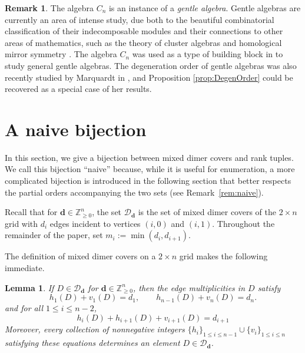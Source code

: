 \documentclass{amsart}
\newtheorem{lemma}[theorem]{Lemma}
\theoremstyle{definition}
\newtheorem{remark}[theorem]{Remark}
\begin{document}
\begin{remark}
The algebra $C_n$ is an instance of a \emph{gentle algebra}. Gentle algebras are currently an area of intense study, due both to the beautiful combinatorial classification of their indecomposable modules \cite{zbMATH03989588,zbMATH03904786} and their connections to other areas of mathematics, such as the theory of cluster algebras \cite{zbMATH05704468} and homological mirror symmetry \cite{zbMATH07159952}. The algebra $C_n$  was used as a type of building block in \cite{Schemes} to study general gentle algebras. The degeneration order of gentle algebras was also recently studied by Marquardt in \cite{marquardt2026}, and Proposition \ref{prop:DegenOrder} could be recovered as a special case of her results. 
\end{remark}




\section{A naive bijection}
\label{sec:naive}

In this section, we give a bijection between mixed dimer covers and rank tuples. We call this bijection ``naive'' because, while it is useful for enumeration, a more complicated bijection is introduced in the following section that better respects the partial orders accompanying the two sets (see Remark~\ref{rem:naive}).

 Recall that for $\mathbf{d} \in \mathbb{Z}_{\geq 0}^n$, the set $\mathcal{D}_{\mathbf{d}}$ is the set of mixed dimer covers of the $2 \times n$ grid with $d_i$ edges incident to vertices $(i,0)$ and $(i,1)$. Throughout the remainder of the paper, set $m_i:= \min(d_i,d_{i+1})$. 


The definition of mixed dimer covers on a $2 \times n$ grid makes the following immediate.

\begin{lemma}\label{lem:VsHsDs}
If $D \in \mathcal{D}_{\mathbf{d}}$ for $\mathbf{d}\in\mathbb{Z}_{\ge 0}^n$, then the edge multiplicities in $D$ satisfy  
\begin{equation*}
 h_1(D) + v_1(D) = d_1, \qquad h_{n-1}(D) + v_n(D) = d_n. \label{}
\end{equation*}
and for all $1 \leq i \leq n-2$,
\begin{equation*}
 h_i(D) + h_{i+1}(D) + v_{i+1}(D) = d_{i+1}
\end{equation*}
Moreover, every collection of nonnegative integers $\{h_i\}_{1 \leq i \leq n-1} \cup \{v_i\}_{1 \leq i \leq n}$ satisfying these equations determines an element  $D \in \mathcal{D}_{\mathbf{d}}$. 
\end{lemma}
\end{document}
